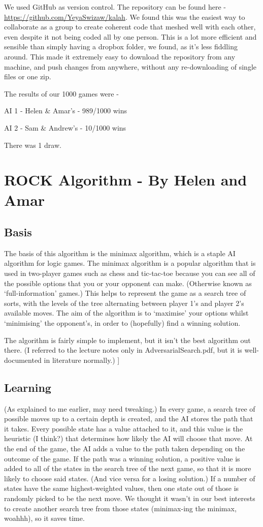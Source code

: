 \documentclass[11pt]{article}
\begin{document}
We used GitHub as version control. The repository can be found here - \url{https://github.com/YeyaSwizaw/kalah}. We found this was the easiest way to collaborate as a group to create coherent code that meshed well with each other, even despite it not being coded all by one person. This is a lot more efficient and sensible than simply having a dropbox folder, we found, as it's less fiddling around. This made it extremely easy to download the repository from any machine, and push changes from anywhere, without any re-downloading of single files or one zip.

The results of our 1000 games were -

AI 1 - Helen \& Amar's - 989/1000 wins

AI 2 - Sam \& Andrew's - 10/1000 wins

There was 1 draw.
\section{ROCK Algorithm - By Helen and Amar}
\label{sec-2}

\subsection{Basis}
\label{sec-2-1}

The basis of this algorithm is the minimax algorithm, which is a staple AI algorithm for logic games. The minimax algorithm is a popular algorithm that is used in two-player games such as chess and tic-tac-toe because you can see all of the possible options that you or your opponent can make. (Otherwise known as ‘full-information’ games.)  This helps to represent the game as a search tree of sorts, with the levels of the tree alternating between player 1’s and player 2’s available moves. The aim of the algorithm is to ‘maximise’ your options whilst ‘minimising’ the opponent’s, in order to (hopefully) find a winning solution.

The algorithm is fairly simple to implement, but it isn’t the best algorithm out there. (I referred to the lecture notes only in AdversarialSearch.pdf, but it is well-documented in literature normally.) ]
\subsection{Learning}
\label{sec-2-2}

(As explained to me earlier, may need tweaking.) In every game, a search tree of possible moves up to a certain depth is created, and the AI stores the path that it takes. Every possible state has a value attached to it, and this value is the heuristic (I think?) that determines how likely the AI will choose that move. At the end of the game, the AI adds a value to the path taken depending on the outcome of the game. If the path was a winning solution, a positive value is added to all of the states in the search tree of the next game, so that it is more likely to choose said states. (And vice versa for a losing solution.) If a number of states have the same highest-weighted values, then one state out of those is randomly picked to be the next move. We thought it wasn’t in our best interests to create another search tree from those states (minimax-ing the minimax, woahhh), so it saves time.
\end{document}
